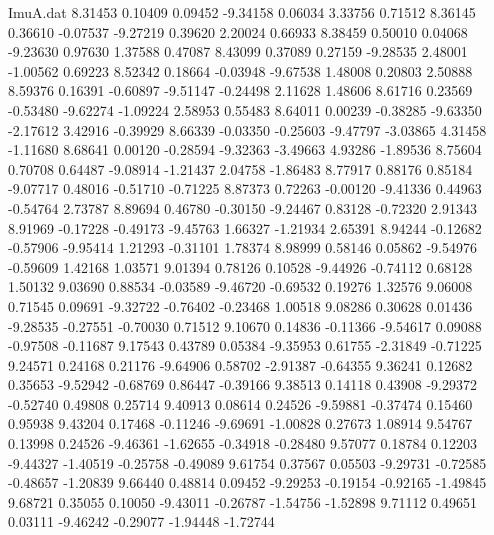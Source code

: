 \begin{filecontents}{ImuA.dat}
   8.31453    0.10409    0.09452   -9.34158    0.06034    3.33756    0.71512
   8.36145    0.36610   -0.07537   -9.27219    0.39620    2.20024    0.66933
   8.38459    0.50010    0.04068   -9.23630    0.97630    1.37588    0.47087
   8.43099    0.37089    0.27159   -9.28535    2.48001   -1.00562    0.69223
   8.52342    0.18664   -0.03948   -9.67538    1.48008    0.20803    2.50888
   8.59376    0.16391   -0.60897   -9.51147   -0.24498    2.11628    1.48606
   8.61716    0.23569   -0.53480   -9.62274   -1.09224    2.58953    0.55483
   8.64011    0.00239   -0.38285   -9.63350   -2.17612    3.42916   -0.39929
   8.66339   -0.03350   -0.25603   -9.47797   -3.03865    4.31458   -1.11680
   8.68641    0.00120   -0.28594   -9.32363   -3.49663    4.93286   -1.89536
   8.75604    0.70708    0.64487   -9.08914   -1.21437    2.04758   -1.86483
   8.77917    0.88176    0.85184   -9.07717    0.48016   -0.51710   -0.71225
   8.87373    0.72263   -0.00120   -9.41336    0.44963   -0.54764    2.73787
   8.89694    0.46780   -0.30150   -9.24467    0.83128   -0.72320    2.91343
   8.91969   -0.17228   -0.49173   -9.45763    1.66327   -1.21934    2.65391
   8.94244   -0.12682   -0.57906   -9.95414    1.21293   -0.31101    1.78374
   8.98999    0.58146    0.05862   -9.54976   -0.59609    1.42168    1.03571
   9.01394    0.78126    0.10528   -9.44926   -0.74112    0.68128    1.50132
   9.03690    0.88534   -0.03589   -9.46720   -0.69532    0.19276    1.32576
   9.06008    0.71545    0.09691   -9.32722   -0.76402   -0.23468    1.00518
   9.08286    0.30628    0.01436   -9.28535   -0.27551   -0.70030    0.71512
   9.10670    0.14836   -0.11366   -9.54617    0.09088   -0.97508   -0.11687
   9.17543    0.43789    0.05384   -9.35953    0.61755   -2.31849   -0.71225
   9.24571    0.24168    0.21176   -9.64906    0.58702   -2.91387   -0.64355
   9.36241    0.12682    0.35653   -9.52942   -0.68769    0.86447   -0.39166
   9.38513    0.14118    0.43908   -9.29372   -0.52740    0.49808    0.25714
   9.40913    0.08614    0.24526   -9.59881   -0.37474    0.15460    0.95938
   9.43204    0.17468   -0.11246   -9.69691   -1.00828    0.27673    1.08914
   9.54767    0.13998    0.24526   -9.46361   -1.62655   -0.34918   -0.28480
   9.57077    0.18784    0.12203   -9.44327   -1.40519   -0.25758   -0.49089
   9.61754    0.37567    0.05503   -9.29731   -0.72585   -0.48657   -1.20839
   9.66440    0.48814    0.09452   -9.29253   -0.19154   -0.92165   -1.49845
   9.68721    0.35055    0.10050   -9.43011   -0.26787   -1.54756   -1.52898
   9.71112    0.49651    0.03111   -9.46242   -0.29077   -1.94448   -1.72744

\end{filecontents}
